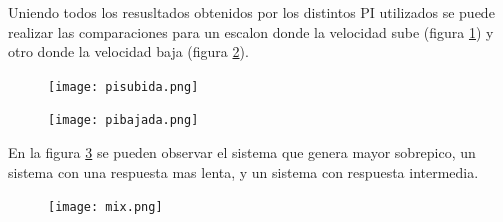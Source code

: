     Uniendo todos los resusltados obtenidos por los distintos PI utilizados se puede realizar las comparaciones para un escalon donde la velocidad sube (figura \ref{fig:pisubuda}) y otro donde la velocidad baja (figura \ref{fig:pibajada}).
    
    \begin{figure}[h!]
    	\centering
    	\texttt{[image: pisubida.png]}
    	\label{fig:pisubuda}
    \end{figure}
    
    \begin{figure}[h!]
    	\centering
    	\texttt{[image: pibajada.png]}
    	\label{fig:pibajada}
    \end{figure}
    
    
    En la figura \ref{fig:mix} se pueden observar el sistema que genera mayor sobrepico, un sistema con una respuesta mas lenta, y un sistema con respuesta intermedia. 
    \begin{figure}[h!]
    	\centering
    	\texttt{[image: mix.png]}
    	\label{fig:mix}
    \end{figure}
    
    \newpage